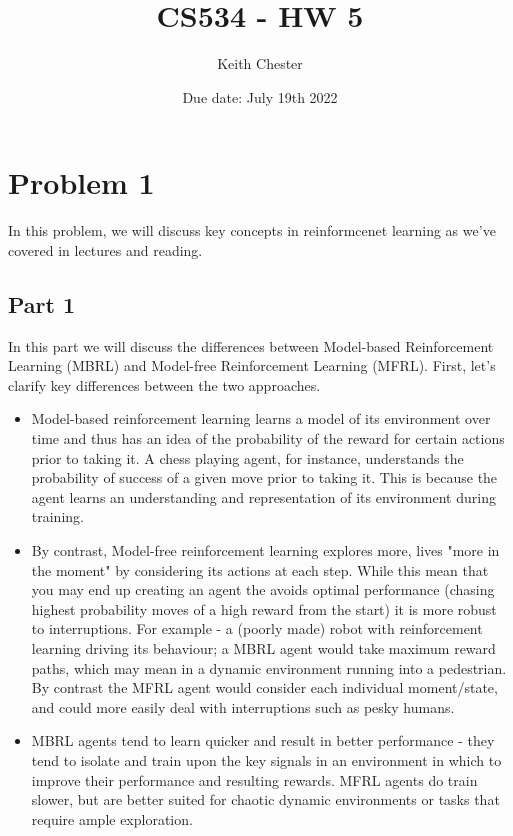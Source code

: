 \documentclass{article}
\title{CS534 - HW 5}
\author{Keith Chester}
\date{Due date: July 19th 2022}
\begin{document}
\maketitle

\section*{Problem 1}

In this problem, we will discuss key concepts in reinformcenet learning as we've covered in lectures and reading.

\subsection*{Part 1}

In this part we will  discuss the differences between Model-based Reinforcement Learning (MBRL) and Model-free Reinforcement Learning (MFRL). First, let's clarify key differences between the two approaches.

\begin{itemize}
    \item Model-based reinforcement learning learns a model of its environment over time and thus has an idea of the probability of the reward for certain actions prior to taking it. A chess playing agent, for instance, understands the probability of success of a given move prior to taking it. This is because the agent learns an understanding and representation of its environment during training.
    \item By contrast, Model-free reinforcement learning explores more, lives "more in the moment" by considering its actions at each step. While this mean that you may end up creating an agent the avoids optimal performance (chasing highest probability moves of a high reward from the start) it is more robust to interruptions. For example - a (poorly made) robot with reinforcement learning driving its behaviour; a MBRL agent would take maximum reward paths, which may mean in a dynamic environment running into a pedestrian. By contrast the MFRL agent would consider each individual moment/state, and could more easily deal with interruptions such as pesky humans.
    \item MBRL agents tend to learn quicker and result in better performance - they tend to isolate and train upon the key signals in an environment in which to improve their performance and resulting rewards. MFRL agents do train slower, but are better suited for chaotic dynamic environments or tasks that require ample exploration.
\end{itemize}
\end{document}
